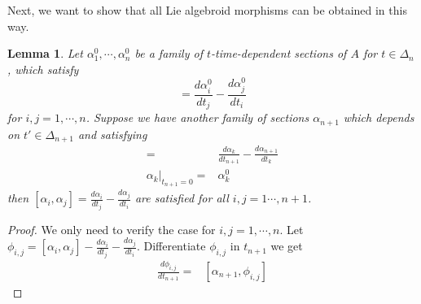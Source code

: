 \documentclass[12pt]{amsart}
\newtheorem{lem}[thm]{Lemma}
\theoremstyle{definition}
\theoremstyle{remark}
\numberwithin{equation}{section}
\newcommand{\1}{{\mathbb{1}}}
\begin{document}
Next, we want to show that all Lie algebroid morphisms can be obtained in this way.
\begin{lem}\label{extension}
    Let $\alpha^0_1, \cdots, \alpha^0_n$ be a family of $t$-time-dependent sections of $A$ for $t\in \Delta_n$, which satisfy 
    \begin{equation*}
        [\alpha_i^0, \alpha_j^0] =  \frac{d \alpha_i^0}{d t_j} - \frac{d \alpha_j^0}{d t_i}
    \end{equation*}
    for $i,j = 1,\cdots, n$. Suppose we have another family of sections $\alpha_{n+1}$ which depends on $t'\in \Delta_{n+1}$ and satisfying
    \begin{align*}
        [\alpha_k, \alpha_{n+1}] =&  \frac{d \alpha_k}{d t_{n+1}} - \frac{d \alpha_{n+1}}{d t_k}\\
        \alpha_k|_{t_{n+1} = 0} =&  \alpha_k^0
    \end{align*}
    then $[\alpha_i, \alpha_j] =  \frac{d \alpha_i}{d t_j} - \frac{d \alpha_j}{d t_i}$ are satisfied for all $i,j = 1 \cdots, n+1$.
\end{lem}
\begin{proof}
    We only need to verify the case for $i , j= 1, \cdots, n$. Let $\phi_{i, j} = [\alpha_i, \alpha_j] -  \frac{d \alpha_i}{d t_j} - \frac{d \alpha_j}{d t_i}$. Differentiate $\phi_{i,j}$ in $t_{n+1}$ we get
    \begin{align*}
        \frac{d\phi_{i,j}}{dt_{n+1}} =& [\alpha_{n+1}, \phi_{i,j}]
    \end{align*}
    
    
\end{proof}
\end{document}
